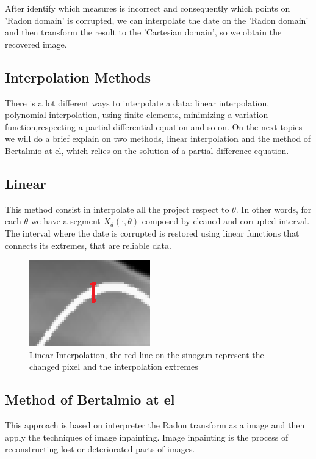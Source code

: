 After identify which measures is incorrect and consequently which points on 'Radon domain' is corrupted, we can interpolate the date on the 'Radon domain' and then transform the result to the 'Cartesian domain', so we obtain the recovered image.

\subsection{Interpolation Methods}
There is a lot different ways to interpolate a data: linear interpolation, polynomial interpolation, using finite elements, minimizing a variation function,respecting a partial differential equation and so on. On the next topics we will do a brief explain on two methods, linear interpolation and the method of Bertalmio at el, which relies on the solution of a partial difference equation.

\subsection{Linear}
This method consist in interpolate all the project respect to $\theta$. In other words, for each $\theta$ we have a segment $X_d(\cdot,\theta)$ composed by cleaned and corrupted interval. The interval where the date is corrupted is restored using linear functions that connects its extremes, that are reliable data.

\begin{figure}[h]
\centering
\includegraphics[scale=1]{img/LI}
\caption{Linear Interpolation, the red line on the sinogam represent the changed pixel and the interpolation extremes}\label{LI}
\end{figure}

\subsection{Method of Bertalmio at el}

This approach is based on interpreter the Radon transform as a image and then apply the techniques of image inpainting. Image inpainting is the process of reconstructing lost or deteriorated parts of images.

